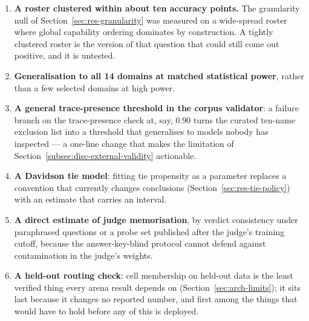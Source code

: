 \begin{enumerate}
\item \textbf{A roster clustered within about ten accuracy points.} The
granularity null of Section~\ref{sec:res-granularity} was measured on a
wide-spread roster where global capability ordering dominates by
construction. A tightly clustered roster is the version of
that question that could still come out positive, and it is untested.

\item \textbf{Generalisation to all 14 domains at matched statistical
power}, rather than a few selected domains at high power.

\item \textbf{A general trace-presence threshold in the corpus
validator}: a failure branch on the trace-presence check at, say,
$0.90$ turns the curated ten-name exclusion list into a threshold that
generalises to models nobody has inspected --- a one-line change that
makes the limitation of Section~\ref{subsec:disc-external-validity}
actionable.

\item \textbf{A Davidson tie model}: fitting tie propensity as a
parameter replaces a convention that currently changes conclusions
(Section~\ref{sec:res-tie-policy}) with an estimate that carries an
interval.

\item \textbf{A direct estimate of judge memorisation}, by verdict
consistency under paraphrased questions or a probe set published after
the judge's training cutoff, because the answer-key-blind protocol
cannot defend against contamination in the judge's weights.

\item \textbf{A held-out routing check}: cell membership on held-out
data is the least verified thing every arena result depends on
(Section~\ref{sec:arch-limits}); it sits last because it changes no
reported number, and first among the things that would have to hold
before any of this is deployed.

\end{enumerate}
